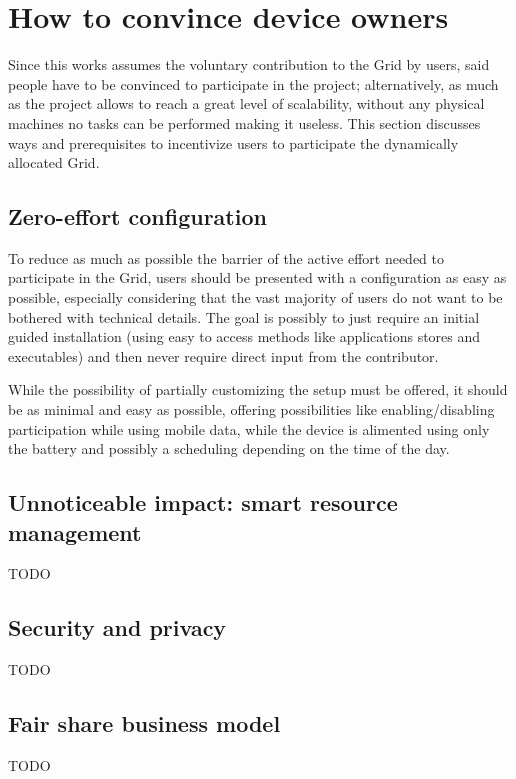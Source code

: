\section{How to convince device owners}
Since this works assumes the voluntary contribution to the Grid by users, said people have to be convinced to participate in the project; alternatively, as much as the project allows to reach a great level of scalability, without any physical machines no tasks can be performed making it useless. This section discusses ways and prerequisites to incentivize users to participate the dynamically allocated Grid.

\subsection{Zero-effort configuration}
To reduce as much as possible the barrier of the active effort needed to participate in the Grid, users should be presented with a configuration as easy as possible, especially considering that the vast majority of users do not want to be bothered with technical details. The goal is possibly to just require an initial guided installation (using easy to access methods like applications stores and executables) and then never require direct input from the contributor.

While the possibility of partially customizing the setup must be offered, it should be as minimal and easy as possible, offering possibilities like enabling/disabling participation while using mobile data, while the device is alimented using only the battery and possibly a scheduling depending on the time of the day. 

\subsection{Unnoticeable impact: smart resource management}
TODO

\subsection{Security and privacy}
TODO

\subsection{Fair share business model}
TODO
